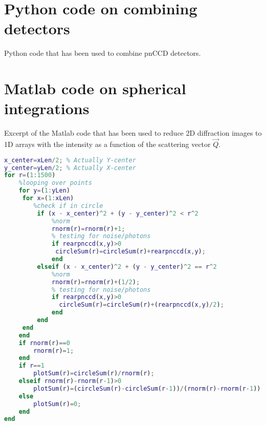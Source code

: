 %
%
%
\section{Python code on combining detectors}\label{sec:combination-of-detectors-code}
Python code that has been used to combine pnCCD detectors.

%
%
%
\section{Matlab code on spherical integrations}\label{sec:spherical-integration}
Excerpt of the Matlab code that has been used to reduce 2D diffraction images to 1D arrays with the intensity as a function of the scattering vector $\vec{Q}$.
\begin{lstlisting}[language=matlab,frame=single,basicstyle=\footnotesize]
%%% CENTER OF HIT
x_center=xLen/2; % Actually Y-center
y_center=yLen/2; % Actually X-center
for r=(1:1500)
    %looping over points
    for y=(1:yLen)
     for x=(1:xLen)
        %check if in circle
         if (x - x_center)^2 + (y - y_center)^2 < r^2
             %norm
             rnorm(r)=rnorm(r)+1;
             % testing for noise/photons
             if rearpnccd(x,y)>0
              circleSum(r)=circleSum(r)+rearpnccd(x,y);
             end
         elseif (x - x_center)^2 + (y - y_center)^2 == r^2
             %norm
             rnorm(r)=rnorm(r)+(1/2);
             % testing for noise/photons
             if rearpnccd(x,y)>0
               circleSum(r)=circleSum(r)+(rearpnccd(x,y)/2);
             end
         end
     end
    end
    if rnorm(r)==0
        rnorm(r)=1;
    end
    if r==1
        plotSum(r)=circleSum(r)/rnorm(r);
    elseif rnorm(r)-rnorm(r-1)>0
        plotSum(r)=(circleSum(r)-circleSum(r-1))/(rnorm(r)-rnorm(r-1));
    else
        plotSum(r)=0;
    end
end
\end{lstlisting}
%
%
%
\iftrue
